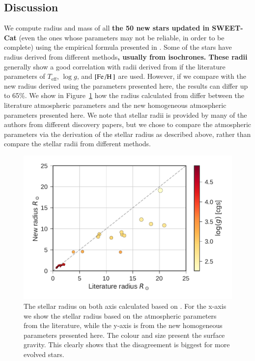 \documentclass{aa}
\begin{document}
\subsection{Discussion}
\label{sec:Discussion}
We compute radius and mass of all {\bf the 50 new stars updated in SWEET-Cat}
(even the ones whose parameters may not be reliable, in order to be complete)
using the empirical formula presented in \citet{Torres2010}. Some of the stars
have radius derived from different methods{\bf , usually from isochrones. These
radii} generally show a good correlation with radii derived from
\citet{Torres2010} if the literature parameters of $T_\mathrm{eff}$, $\log g$,
and $[\ion{Fe}/\ion{H}]$ are used. However, if we compare with the new radius
derived using the parameters presented here, the results can differ up to 65\%.
We show in Figure~\ref{fig:RR} how the radius calculated from \citet{Torres2010}
differ between the literature atmospheric parameters and the new homogeneous
atmospheric parameters presented here. We note that stellar radii is provided by
many of the authors from different discovery papers, but we chose to compare the
atmospheric parameters via the derivation of the stellar radius as described
above, rather than compare the stellar radii from different methods.

\begin{figure}[tpb]
    \centering
    \includegraphics[width=1.0\linewidth]{figures/radiusVSradius.pdf}
    \caption{The stellar radius on both axis calculated based on \citet{Torres2010}.
    For the x-axis we show the stellar radius based on the atmospheric parameters
    from the literature, while the y-axis is from the new homogeneous parameters
    presented here. The colour and size present the surface gravity. This clearly
    shows that the disagreement is biggest for more evolved stars.}
    \label{fig:RR}
\end{figure}
\end{document}
